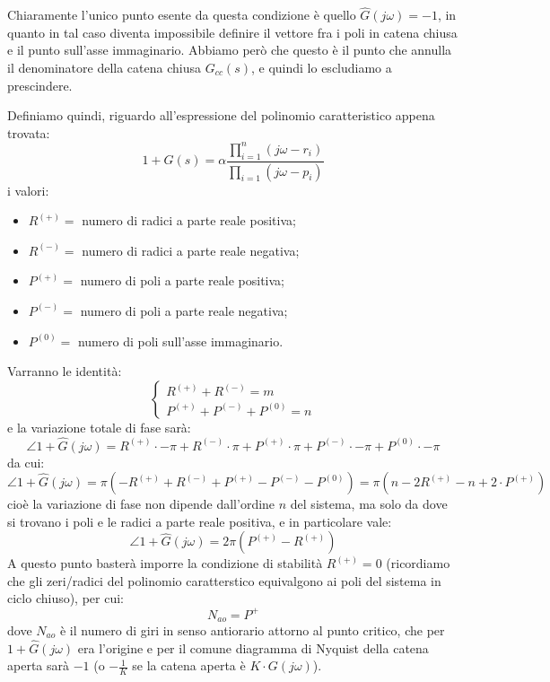 \documentclass[a4paper,11pt]{article}
\begin{document}
\begin{enumerate}
		Chiaramente l'unico punto esente da questa condizione è quello $\hat{G}(j \omega) = -1$, in quanto in tal caso diventa impossibile definire il vettore fra i poli in catena chiusa e il punto sull'asse immaginario.
		Abbiamo però che questo è il punto che annulla il denominatore della catena chiusa $G_{cc}(s)$, e quindi lo escludiamo a prescindere.

		Definiamo quindi, riguardo all'espressione del polinomio caratteristico appena trovata:
		$$
		1 + \hat{G}(s) = \alpha \frac{ \prod_{i = 1}^n (j \omega - r_i) }{ \prod_{i = 1}(j \omega - p_i) }
		$$
		i valori:
		\begin{itemize}
			\item $R^{(+)} =$ numero di radici a parte reale positiva;
			\item $R^{(-)} =$ numero di radici a parte reale negativa;
			\item $P^{(+)} =$ numero di poli a parte reale positiva;
			\item $P^{(-)} =$ numero di poli a parte reale negativa;
			\item $P^{(0)} =$ numero di poli sull'asse immaginario.
		\end{itemize}
		Varranno le identità:
		\[
			\begin{cases}
				R^{(+)} + R^{(-)} = m \\
				P^{(+)} + P^{(-)} + P^{(0)} = n
			\end{cases}
		\]
		e la variazione totale di fase sarà:
		$$
		\angle 1 + \hat{G}(j \omega) = R^{(+)} \cdot - \pi + R^{(-)} \cdot \pi + P^{(+)} \cdot \pi + P^{(-)} \cdot - \pi + P^{(0)} \cdot - \pi
		$$
		da cui:
		$$
		\angle 1 + \hat{G}(j \omega) = \pi \left( -R^{(+)} + R^{(-)} + P^{(+)} - P^{(-)} - P^{(0)} \right) 
		= \pi \left( n - 2 R^{(+)} - n + 2 \cdot P^{(+)} \right)
		$$
		cioè la variazione di fase non dipende dall'ordine $n$ del sistema, ma solo da dove si trovano i poli e le radici a parte reale positiva, e in particolare vale:
		$$
		\angle 1 + \hat{G}(j \omega) = 2 \pi \left( P^{(+)} - R^{(+)} \right)
		$$
		A questo punto basterà imporre la condizione di stabilità $R^{(+)} = 0$ (ricordiamo che gli zeri/radici del polinomio caratterstico equivalgono ai poli del sistema in ciclo chiuso), per cui:
		$$
		N_{ao} = P^+
		$$
		dove $N_{ao}$ è il numero di giri in senso antiorario attorno al punto critico, che per $1 + \hat{G}(j\omega)$ era l'origine e per il comune diagramma di Nyquist della catena aperta sarà $-1$ (o $-\frac{1}{K}$ se la catena aperta è $K \cdot G(j\omega)$).


\end{enumerate}
\end{document}
